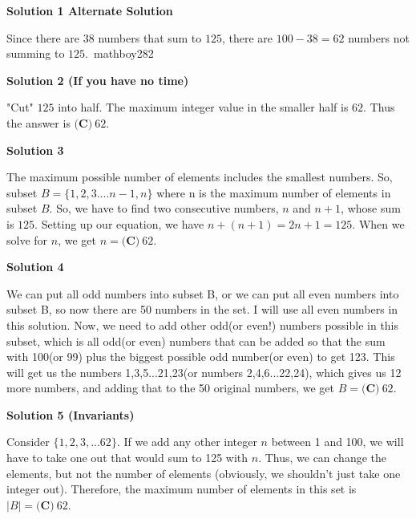 \begin{enumerate}
 



\textbf{Solution 1 Alternate Solution}

Since there are $38$ numbers that sum to $125$, there are $100-38=62$ numbers not summing to $125.$~mathboy282

 



\textbf{Solution 2 (If you have no time)}

"Cut" $125$ into half. The maximum integer value in the smaller half is $62$. Thus the answer is $\boxed{\textbf{(C)}\ 62}$.

 



\textbf{Solution 3}

The maximum possible number of elements includes the smallest numbers. So, subset $B = \{1,2,3....n-1,n\}$  where n is the maximum number of elements in subset $B$. So, we have to find two consecutive numbers, $n$ and $n+1$, whose sum is $125$. Setting up our equation, we have $n+(n+1) = 2n+1 = 125$. When we solve for $n$, we get $n =\boxed{\textbf{(C)}\ 62}$.

 



\textbf{Solution 4}

We can put all odd numbers into subset B, or we can put all even numbers into subset B, so now there are 50 numbers in the set. I will use all even numbers in this solution. Now, we need to add other odd(or even!) numbers possible in this subset, which is all odd(or even) numbers that can be added so that the sum with 100(or 99) plus the biggest possible odd number(or even) to get 123. This will get us the numbers 1,3,5...21,23(or numbers 2,4,6...22,24), which gives us 12 more numbers, and adding that to the 50 original numbers, we get $B =\boxed{\textbf{(C)}\ 62}$.

 



\textbf{Solution 5 (Invariants)}

Consider $\{1,2,3,...62\}$. If we add any other integer $n$ between 1 and 100, we will have to take one out that would sum to 125 with $n$. Thus, we can change the elements, but not the number of elements (obviously, we shouldn't just take one integer out). Therefore, the maximum number of elements in this set is $|B| =\boxed{\textbf{(C)}\ 62}$.

 


\end{enumerate}